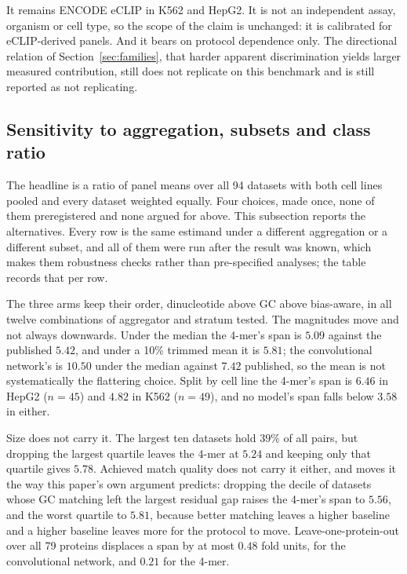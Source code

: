 It remains ENCODE eCLIP in K562 and HepG2. It is not an independent assay, organism or cell
type, so the scope of the claim is unchanged: it is calibrated for eCLIP-derived panels. And
it bears on protocol dependence only. The directional relation of Section~\ref{sec:families},
that harder apparent discrimination yields larger measured contribution, still does not
replicate on this benchmark and is still reported as not replicating.

\subsection{Sensitivity to aggregation, subsets and class ratio}
\label{sec:sensitivity}

The headline is a ratio of panel means over all 94 datasets with both cell lines pooled and
every dataset weighted equally. Four choices, made once, none of them preregistered and none
argued for above. This subsection reports the alternatives. Every row is the same estimand under
a different aggregation or a different subset, and all of them were run after the result was
known, which makes them robustness checks rather than pre-specified analyses; the table records
that per row.

The three arms keep their order, dinucleotide above GC above bias-aware, in all twelve
combinations of aggregator and stratum tested. The magnitudes move and not always downwards.
Under the median the 4-mer's span is $5.09$ against the published $5.42$, and under a 10\%
trimmed mean it is $5.81$; the convolutional network's is $10.50$ under the median against
$7.42$ published, so the mean is not systematically the flattering choice. Split by cell line
the 4-mer's span is $6.46$ in HepG2 ($n=45$) and $4.82$ in K562 ($n=49$), and no model's span
falls below $3.58$ in either.

Size does not carry it. The largest ten datasets hold $39\%$ of all pairs, but dropping the
largest quartile leaves the 4-mer at $5.24$ and keeping only that quartile gives $5.78$.
Achieved match quality does not carry it either, and moves it the way this paper's own argument
predicts: dropping the decile of datasets whose GC matching left the largest residual gap raises
the 4-mer's span to $5.56$, and the worst quartile to $5.81$, because better matching leaves a
higher baseline and a higher baseline leaves more for the protocol to move. Leave-one-protein-out
over all 79 proteins displaces a span by at most $0.48$ fold units, for the convolutional
network, and $0.21$ for the 4-mer.

